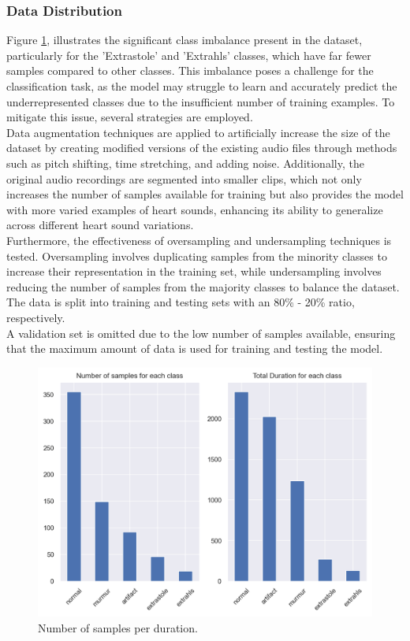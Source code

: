 \subsubsection*{Data Distribution} %
Figure \ref{fig:DataExp_num_durations}, illustrates the significant class imbalance present in the dataset, particularly for the 'Extrastole' and 'Extrahls' classes,
which have far fewer samples compared to other classes.
This imbalance poses a challenge for the classification task,
as the model may struggle to learn and accurately predict the underrepresented classes due to the insufficient number of training examples.
To mitigate this issue, several strategies are employed.\\
Data augmentation techniques are applied to artificially increase the size of the dataset
by creating modified versions of the existing audio files through methods such as pitch shifting, time stretching, and adding noise.
Additionally, the original audio recordings are segmented into smaller clips, which not only increases the number of samples available for training but
also provides the model with more varied examples of heart sounds, enhancing its ability to generalize across different heart sound variations.\\
Furthermore, the effectiveness of oversampling and undersampling techniques is tested. Oversampling involves duplicating samples from the minority classes
to increase their representation in the training set, while undersampling involves reducing the number of samples from the majority classes
to balance the dataset. The data is split into training and testing sets with an 80\% - 20\% ratio, respectively.\\
A validation set is omitted due to the low number of samples available, ensuring that the maximum amount of data is used for training and testing the model.
\begin{figure}[H]
    \centering
    \includegraphics[width=1\columnwidth]{./images/DataExp_num_durations.png}
    \caption{Number of samples per duration.}
    \label{fig:DataExp_num_durations}
\end{figure}

